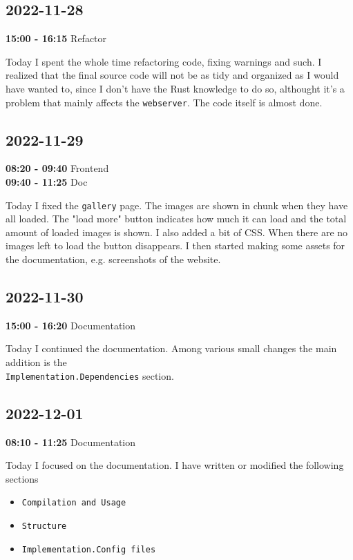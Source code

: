 \documentclass{article}
\begin{document}
\subsection{2022-11-28}

\textbf{15:00 - 16:15} Refactor

Today I spent the whole time refactoring code,
fixing warnings and such. I realized that the final source
code will not be as tidy and organized as I would have wanted to,
since I don't have the Rust knowledge to do so, althought it's a problem
that mainly affects the \texttt{webserver}.
The code itself is almost done.

\subsection{2022-11-29}

\textbf{08:20 - 09:40} Frontend \\
\textbf{09:40 - 11:25} Doc

Today I fixed the \texttt{gallery} page.
The images are shown in chunk when they have all loaded.
The "load more" button indicates how much it can load and
the total amount of loaded images is shown. I also added a bit of CSS.
When there are no images left to load the button disappears.
I then started making some assets for the documentation, e.g.
screenshots of the website.

\subsection{2022-11-30}

\textbf{15:00 - 16:20} Documentation

Today I continued the documentation.
Among various small changes the main addition is the \\
\texttt{Implementation.Dependencies} section.

\subsection{2022-12-01}

\textbf{08:10 - 11:25} Documentation

Today I focused on the documentation.
I have written or modified the following sections

\begin{itemize}
    \item \texttt{Compilation and Usage}
    \item \texttt{Structure}
    \item \texttt{Implementation.Config files}
\end{itemize}
\end{document}
